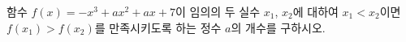함수 $f(x)=-x^3+ax^2+ax+7$이 임의의 두 실수 $x_1$, $x_2$에 대하여 $x_1<x_2$이면 $f(x_1)>f(x_2)$를 만족시키도록 하는 정수 $a$의 개수를 구하시오.
